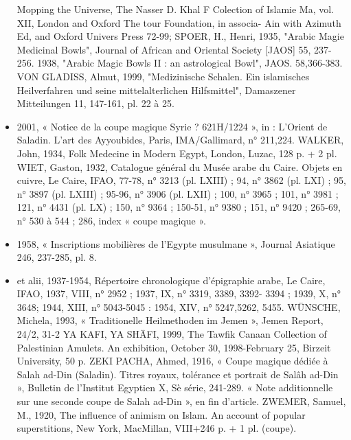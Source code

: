 \begin{itemize}
Mopping the Universe, The Nasser D. Khal F Colection of Islamie
Ma, vol. XII, London and Oxford The tour Foundation, in associa-
Ain with Azimuth Ed, and Oxford Univers Press 72-99;
SPOER, H., Henri, 1935, "Arabic Magie Medicinal Bowls", Journal of
African and Oriental Society [JAOS] 55, 237-256.
1938, "Arabic Magic Bowls II : an astrological Bowl", JAOS.
58,366-383.
VON GLADISS, Almut, 1999, "Medizinische Schalen. Ein islamisches
Heilverfahren und seine mittelalterlichen Hilfsmittel", Damaszener
Mitteilungen 11, 147-161, pl. 22 à 25.
\item 2001, « Notice de la coupe magique Syrie ? 621H/1224 », in : L'Orient de Saladin. L'art des Ayyoubides, Paris, IMA/Gallimard, n° 211,224.
WALKER, John, 1934, Folk Medecine in Modern Egypt, London, Luzac, 128 p. + 2 pl.
WIET, Gaston, 1932, Catalogue général du Musée arabe du Caire.
Objets en cuivre, Le Caire, IFAO, 77-78, n° 3213 (pl. LXIII) ; 94,
n° 3862 (pl. LXI) ; 95, n° 3897 (pl. LXIII) ; 95-96, n° 3906 (pl. LXII) ;
100, n° 3965 ; 101, n° 3981 ; 121, n° 4431 (pl. LX) ; 150, n° 9364 ;
150-51, n° 9380 ; 151, n° 9420 ; 265-69, n° 530 à 544 ; 286, index « coupe magique ».
\item 1958, « Inscriptions mobilières de l'Egypte musulmane », Journal Asiatique 246, 237-285, pl. 8.
\item et alii, 1937-1954, Répertoire chronologique d'épigraphie arabe, Le Caire, IFAO, 1937, VIII, n° 2952 ; 1937, IX, n° 3319, 3389, 3392-
3394 ; 1939, X, n° 3648; 1944, XIII, n° 5043-5045 : 1954, XIV, n° 5247,5262, 5455.
WÜNSCHE, Michela, 1993, « Traditionelle Heilmethoden im Jemen »,
Jemen Report, 24/2, 31-2
YA KAFI, YA SHÄFI, 1999, The Tawfik Canaan Collection of Palestinian
Amulets. An exhibition, October 30, 1998-February 25, Birzeit University, 50 p.
ZEKI PACHA, Ahmed, 1916, « Coupe magique dédiée à Salah ad-Din (Saladin). Titres royaux, tolérance et portrait de Salâh ad-Din », Bulletin de l'Institut Egyptien X, Sè série, 241-289. « Note additionnelle sur une seconde coupe de Salah ad-Din », en fin d'article.
ZWEMER, Samuel, M., 1920, The influence of animism on Islam. An account of popular superstitions, New York, MacMillan, VIII+246
p. + 1 pl. (coupe).
\end{itemize}
 
